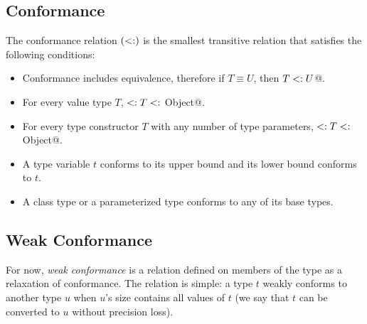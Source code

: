 \subsection{Conformance}
\label{sec:conformance}

The conformance relation $(<:)$ is the smallest transitive relation that satisfies the following conditions:

\begin{itemize}

\item
Conformance includes equivalence, therefore if $T \equiv U$, then \lstinline@$T <: U$@. 

\item
For every value type $T$, \lstinline@Nothing $<: T <:$ Object@. 

\item
For every type constructor $T$ with any number of type parameters, \lstinline@Nothing $<: T <:$ Object@. 

\item
A type variable $t$ conforms to its upper bound and its lower bound conforms to $t$. 

\item
A class type or a parameterized type conforms to any of its base types. 

\end{itemize}






\subsection{Weak Conformance}

For now, {\em weak conformance} is a relation defined on members of the  type as a relaxation of conformance. The relation is simple: a type $t$ weakly conforms to another type $u$ when $u$'s size contains all values of $t$ (we say that $t$ can be converted to $u$ without precision loss). 

